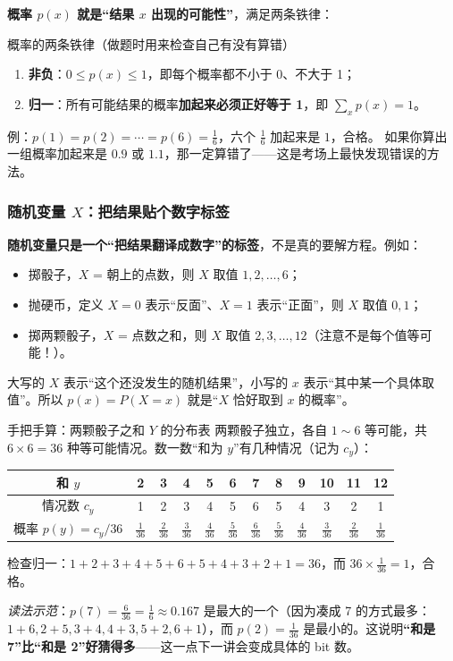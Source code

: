 \textbf{概率 $p(x)$ 就是“结果 $x$ 出现的可能性”}，满足两条铁律：

\begin{defbox}{概率的两条铁律（做题时用来检查自己有没有算错）}
\begin{enumerate}[leftmargin=1.6em,itemsep=1pt,topsep=2pt]
  \item \textbf{非负}：$0\le p(x)\le 1$，即每个概率都不小于 0、不大于 1；
  \item \textbf{归一}：所有可能结果的概率\textbf{加起来必须正好等于 1}，即
        $\displaystyle\sum_{x}p(x)=1$。
\end{enumerate}
例：$p(1)=p(2)=\cdots=p(6)=\tfrac16$，六个 $\tfrac16$ 加起来是 $1$，合格。
如果你算出一组概率加起来是 $0.9$ 或 $1.1$，那一定算错了——这是考场上最快发现错误的方法。
\end{defbox}

\subsubsection*{随机变量 $X$：把结果贴个数字标签}

\textbf{随机变量只是一个“把结果翻译成数字”的标签}，不是真的要解方程。例如：
\begin{itemize}[leftmargin=1.6em,itemsep=1pt,topsep=2pt]
  \item 掷骰子，$X$ = 朝上的点数，则 $X$ 取值 $1,2,\dots,6$；
  \item 抛硬币，定义 $X=0$ 表示“反面”、$X=1$ 表示“正面”，则 $X$ 取值 $0,1$；
  \item 掷两颗骰子，$X$ = 点数之和，则 $X$ 取值 $2,3,\dots,12$（注意不是每个值等可能！）。
\end{itemize}
大写的 $X$ 表示“这个还没发生的随机结果”，小写的 $x$ 表示“其中某一个具体取值”。所以
$p(x)=P(X=x)$ 就是“$X$ 恰好取到 $x$ 的概率”。

\begin{calc}{手把手算：两颗骰子之和 $Y$ 的分布表}
两颗骰子独立，各自 $1\sim6$ 等可能，共 $6\times 6=36$ 种等可能情况。数一数“和为 $y$”有几种情况（记为 $c_y$）：
\begin{center}
\renewcommand{\arraystretch}{1.2}
\begin{tabular}{c|ccccccccccc}
\toprule
和 $y$ & 2 & 3 & 4 & 5 & 6 & 7 & 8 & 9 & 10 & 11 & 12\\
\midrule
情况数 $c_y$ & 1 & 2 & 3 & 4 & 5 & 6 & 5 & 4 & 3 & 2 & 1\\
概率 $p(y)=c_y/36$ & $\frac1{36}$ & $\frac2{36}$ & $\frac3{36}$ & $\frac4{36}$ & $\frac5{36}$ & $\frac6{36}$ & $\frac5{36}$ & $\frac4{36}$ & $\frac3{36}$ & $\frac2{36}$ & $\frac1{36}$\\
\bottomrule
\end{tabular}
\end{center}
检查归一：$1+2+3+4+5+6+5+4+3+2+1=36$，而 $36\times\frac{1}{36}=1$，合格。

\emph{读法示范}：$p(7)=\frac{6}{36}=\frac16\approx0.167$ 是最大的一个（因为凑成 7 的方式最多：$1+6,2+5,3+4,4+3,5+2,6+1$），而 $p(2)=\frac{1}{36}$ 是最小的。这说明\textbf{“和是 7”比“和是 2”好猜得多}——这一点下一讲会变成具体的 bit 数。
\end{calc}

